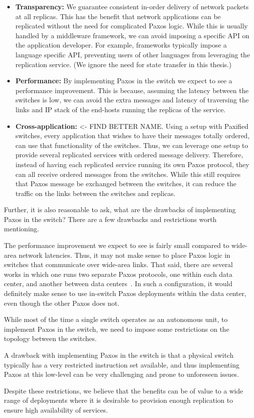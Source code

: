 \documentclass{article}
\begin{document}
\begin{itemize}
  \item \textbf{Transparency:} We guarantee consistent in-order delivery of
network packets at all replicas. This has the benefit that network
applications can be replicated without the need for complicated Paxos logic.
While this is usually handled by a middleware framework, we can avoid
imposing a specific API on the application developer. For example,
         frameworks typically impose a language specific API, preventing
users of other languages from leveraging the replication service.  (We
    ignore the need for state transfer in this thesis.)

  \item \textbf{Performance:} By implementing Paxos in the switch we expect
  to see a performance improvement. This is because, assuming the latency
  between the switches is low, we can avoid the extra messages and latency
  of traversing the links and IP stack of the end-hosts running the replicas
  of the service.

  \item \textbf{Cross-application:} <- FIND BETTER NAME. Using a setup with
  Paxified switches, every application that wishes to have their messages
  totally ordered, can use that functionality of the switches. Thus, we can
  leverage one setup to provide several replicated services with ordered
  message delivery. Therefore, instead of having each replicated service
  running its own Paxos protocol, they can all receive ordered messages from
  the switches. While this still requires that Paxos message be exchanged
  between the switches, it can reduce the traffic on the links between the
  switches and replicas.
\end{itemize}

Further, it is also reasonable to ask, what are the drawbacks of
implementing Paxos in the switch? There are a few drawbacks and restrictions
worth mentioning. 

The performance improvement we expect to see is fairly small compared to
wide-area network latencies. Thus, it may not make sense to place Paxos
logic in switches that communicate over wide-area links. That said, there
are several works in which one runs two separate Paxos protocols, one within
each data center, and another between data centers~\cite{zorfu,steward,cft}.
In such a configuration, it would definitely make sense to use in-switch
Paxos deployments within the data center, even though the other Paxos does
not.

While most of the time a single switch operates as an autonomous unit, to
implement Paxos in the switch, we need to impose some restrictions on the
topology between the switches.

A drawback with implementing Paxos in the switch is that a physical switch
typically has a very restricted instruction set available, and thus
implementing Paxos at this low-level can be very challenging and prone to
unforeseen issues.

Despite these restrictions, we believe that the benefits can be of value to
a wide range of deployments where it is desirable to provision enough
replication to ensure high availability of services. 

	
\end{document}
